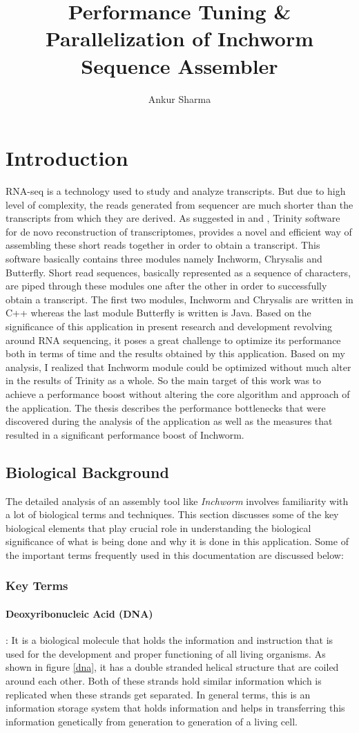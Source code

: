 \label{key}\documentclass[plainarticle, english ,zihtitle,final,hyperref,utf8]{zihpub}
\author{Ankur Sharma}
\title{Performance Tuning \& Parallelization of Inchworm Sequence Assembler}
\begin{document}
\listoffigures
\newpage
\section{Introduction} 
RNA-seq is a technology used to study and analyze transcripts. But due to high level of complexity, the reads generated from sequencer are much shorter than the transcripts from which they are derived. As suggested in \cite{trinitynew} and \cite{Trinity}, Trinity software for de novo reconstruction of transcriptomes, provides a novel and efficient way of assembling these short reads together in order to obtain a transcript. This software basically contains three modules namely Inchworm, Chrysalis and Butterfly. Short read sequences, basically represented as a sequence of characters, are piped through these modules one after the other in order to successfully obtain a transcript. The first two modules, Inchworm and Chrysalis are written in C++ whereas the last module Butterfly is written is Java. Based on the significance of this application in present research and development revolving around RNA sequencing, it poses a great challenge to optimize its performance both in terms of time and the results obtained by this application. Based on my analysis, I realized that Inchworm module could be optimized without much alter in the results of Trinity as a whole. So the main target of this work was to achieve a performance boost  without altering the core algorithm and approach of the application. The thesis describes the performance bottlenecks that were discovered during the analysis of the application as well as the measures that resulted in a significant performance boost of Inchworm.
\subsection{Biological Background}
The detailed analysis of  an assembly tool like \emph{Inchworm} involves familiarity with a lot of biological terms and techniques. This section discusses some of the key biological elements that play crucial role in understanding the biological significance of what is being done and why it is done in this application. Some of the important terms frequently used in this documentation are discussed below:
\subsubsection{Key Terms}
\paragraph{Deoxyribonucleic Acid (DNA)}: It is a biological molecule that holds the information and instruction that is used for the development and proper functioning of all living organisms. As shown in figure \ref{dna}, it has a double stranded helical structure that are coiled around each other. Both of these strands hold similar information which is replicated when these strands get separated. In general terms, this is an information storage system that holds information and helps in transferring this information genetically from generation to generation of a living cell.
\end{document}
